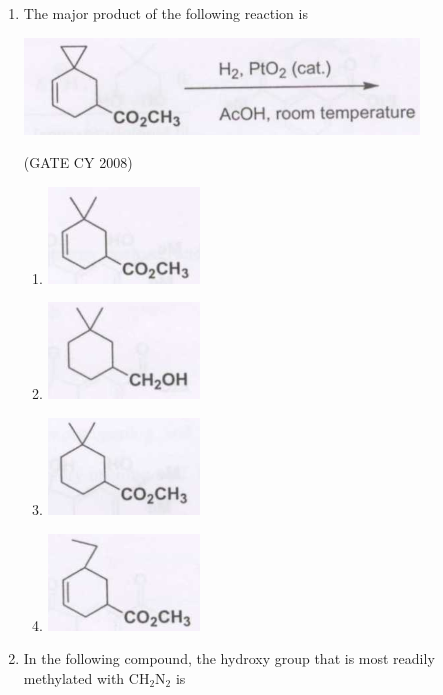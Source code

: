 \documentclass[12pt]{article}
\begin{document}
\begin{enumerate}
\item The major product of the following reaction is

\begin{center}
\includegraphics[width=0.6\columnwidth]{figs/q47.png}
\end{center}    \hfill{(GATE CY 2008)}
\begin{enumerate}
    \item \includegraphics[width=0.3\columnwidth]{figs/q47 a.png}
    \item \includegraphics[width=0.3\columnwidth]{figs/q47 b.png}
    \item \includegraphics[width=0.3\columnwidth]{figs/q47 c.png}
    \item \includegraphics[width=0.3\columnwidth]{figs/q47 d.png}
\end{enumerate}

\item In the following compound, the hydroxy group that is most readily methylated with CH$_2$N$_2$ is


\end{enumerate}
\end{document}
